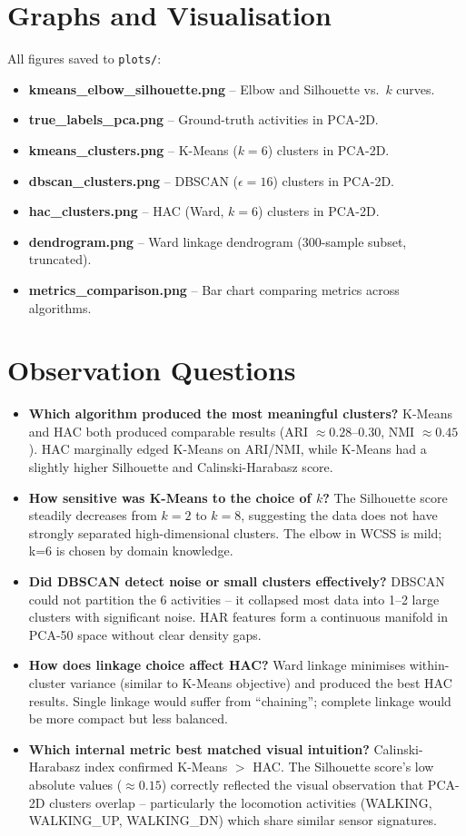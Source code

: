 \documentclass[11pt]{article}
\begin{document}
\section*{Graphs and Visualisation}
All figures saved to \texttt{plots/}:
\begin{itemize}
    \item \textbf{kmeans\_elbow\_silhouette.png} -- Elbow and Silhouette vs.\ $k$ curves.
    \item \textbf{true\_labels\_pca.png} -- Ground-truth activities in PCA-2D.
    \item \textbf{kmeans\_clusters.png} -- K-Means ($k=6$) clusters in PCA-2D.
    \item \textbf{dbscan\_clusters.png} -- DBSCAN ($\epsilon=16$) clusters in PCA-2D.
    \item \textbf{hac\_clusters.png} -- HAC (Ward, $k=6$) clusters in PCA-2D.
    \item \textbf{dendrogram.png} -- Ward linkage dendrogram (300-sample subset, truncated).
    \item \textbf{metrics\_comparison.png} -- Bar chart comparing metrics across algorithms.
\end{itemize}

\section*{Observation Questions}
\begin{itemize}
    \item \textbf{Which algorithm produced the most meaningful clusters?} K-Means and HAC both produced comparable results (ARI $\approx 0.28$--$0.30$, NMI $\approx 0.45$). HAC marginally edged K-Means on ARI/NMI, while K-Means had a slightly higher Silhouette and Calinski-Harabasz score.
    \item \textbf{How sensitive was K-Means to the choice of $k$?} The Silhouette score steadily decreases from $k=2$ to $k=8$, suggesting the data does not have strongly separated high-dimensional clusters. The elbow in WCSS is mild; k=6 is chosen by domain knowledge.
    \item \textbf{Did DBSCAN detect noise or small clusters effectively?} DBSCAN could not partition the 6 activities -- it collapsed most data into 1--2 large clusters with significant noise. HAR features form a continuous manifold in PCA-50 space without clear density gaps.
    \item \textbf{How does linkage choice affect HAC?} Ward linkage minimises within-cluster variance (similar to K-Means objective) and produced the best HAC results. Single linkage would suffer from ``chaining''; complete linkage would be more compact but less balanced.
    \item \textbf{Which internal metric best matched visual intuition?} Calinski-Harabasz index confirmed K-Means $>$ HAC. The Silhouette score's low absolute values ($\approx 0.15$) correctly reflected the visual observation that PCA-2D clusters overlap -- particularly the locomotion activities (WALKING, WALKING\_UP, WALKING\_DN) which share similar sensor signatures.
\end{itemize}
\end{document}
